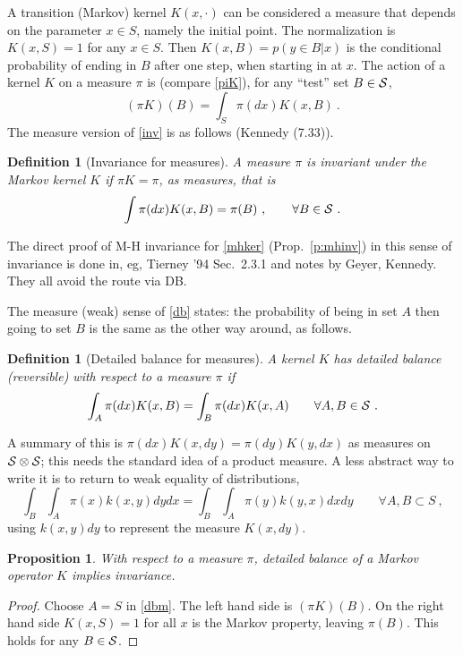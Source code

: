 \documentclass[10pt]{article}
\newcommand{\be}{\begin{equation}}
\newcommand{\ee}{\end{equation}}
\newtheorem{pro}[thm]{Proposition}
\newtheorem{dfn}[thm]{Definition}
\begin{document}
A transition (Markov) kernel $K(x,\cdot)$ can be considered a measure
that depends on the parameter $x\in S$, namely the initial point.
The normalization is $K(x,S)=1$ for any $x\in S$.
Then $K(x,B) = p(y\in B | x)$ is the conditional probability of ending in
$B$ after one step, when starting in at $x$.
The action of a kernel $K$ on a measure $\pi$ is
(compare \eqref{piK}),
for any ``test'' set $B \in \cal S$,
$$
(\pi K)(B) = \int_S \pi(dx) K(x,B)~.
$$
The measure version of \eqref{inv} is as follows (Kennedy (7.33)).
\begin{dfn}[Invariance for measures]
  A measure $\pi$ is invariant under the Markov kernel $K$ if
  $\pi K = \pi$, as measures, that is
  \be
  \int \pi(dx) K(x,B) = \pi(B) ~, \qquad \forall B \in \cal S~.
  \ee
  \label{d:invm}
\end{dfn}
The direct proof of M-H invariance for \eqref{mhker} (Prop.~\ref{p:mhinv})
in this sense of invariance is
done in, eg, Tierney '94 Sec.~2.3.1 and notes by Geyer, Kennedy.
They all avoid the route via DB.

The measure (weak) sense of \eqref{db}
states: the probability of being in set $A$ then going to
set $B$ is the same as the other way around, as follows.
\begin{dfn}[Detailed balance for measures]
  A kernel $K$ has detailed balance (reversible) with respect to
  a measure $\pi$ if
  \be
  \int_A \pi(dx) K(x,B) = \int_B \pi(dx) K(x,A) \qquad \forall A,B \in \cal S~.
  \label{dbm}
  \ee
  \label{d:dbm}
\end{dfn}
A summary of this is $\pi(dx) K(x,dy) = \pi(dy) K(y,dx)$ as measures
on $\cal S \otimes \cal S$; this needs the standard idea of a product measure.
A less abstract way to write it is to return to weak equality of
distributions,
$$
\int_B \int_A \pi(x) k(x,y) dy dx =
\int_B \int_A \pi(y) k(y,x) dx dy \qquad \forall A,B \subset S~,
$$
using $k(x,y)dy$ to represent the measure $K(x,dy)$.

\begin{pro}
  With respect to a measure $\pi$, detailed balance of a Markov operator $K$ implies invariance.
  \label{p:dbim}
\end{pro}
\begin{proof}
  Choose $A=S$ in \eqref{dbm}. The left hand side is $(\pi K)(B)$.
  On the right hand side $K(x,S)=1$ for all $x$ is the Markov property,
  leaving $\pi(B)$. This holds for any $B\in \cal S$.
\end{proof}


\end{document}
